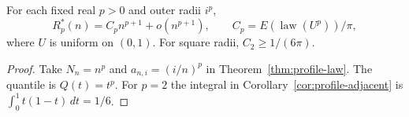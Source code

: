\begin{corollary}\label{cor:profile-powers}
For each fixed real $p>0$ and outer radii $i^p$,
\[
 R_p^*(n)=C_p n^{p+1}+o(n^{p+1}),\qquad
 C_p=E(\operatorname{law}(U^p))/\pi ,
\]
where $U$ is uniform on $(0,1)$. For square radii, $C_2\ge 1/(6\pi)$.
\end{corollary}
\begin{proof}
Take $N_n=n^p$ and $a_{n,i}=(i/n)^p$ in Theorem~\ref{thm:profile-law}.
The quantile is $Q(t)=t^p$. For $p=2$ the integral in
Corollary~\ref{cor:profile-adjacent} is $\int_0^1t(1-t)\,dt=1/6$.
\end{proof}
